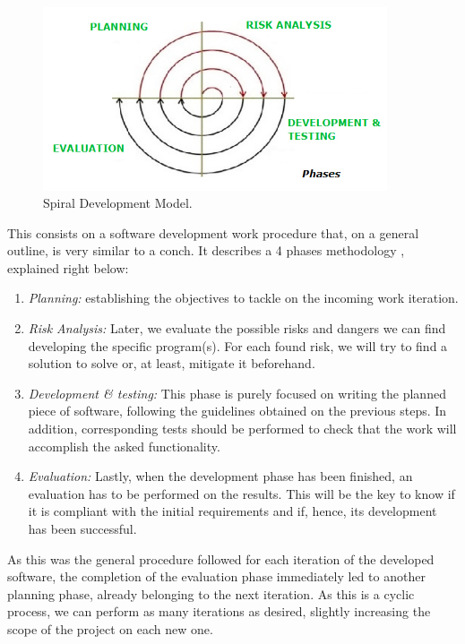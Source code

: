 \begin{figure}[h]
	\centering
	\includegraphics[width=4in]{images/spiral}
	\caption{Spiral Development Model.}
	\label{fig:2_spiral}
\end{figure}

This consists on a software development work procedure that, on a general outline, is very similar to a conch. It describes a 4 phases methodology \cite{spiral-steps}, explained right below:

\begin{enumerate}
	\item \textit{Planning:} establishing the objectives to tackle on the incoming work iteration.

	\item \textit{Risk Analysis:} Later, we evaluate the possible risks and dangers we can find developing the specific program(s). For each found risk, we will try to find a solution to solve or, at least, mitigate it beforehand.

	\item \textit{Development \& testing:} This phase is purely focused on writing the planned piece of software, following the guidelines obtained on the previous steps. In addition, corresponding tests should be performed to check that the work will accomplish the asked functionality.
	\item \textit{Evaluation:} Lastly, when the development phase has been finished, an evaluation has to be performed on the results. This will be the key to know if it is compliant with the initial requirements and if, hence, its development has been successful.
\end{enumerate}

As this was the general procedure followed for each iteration of the developed software, the completion of the evaluation phase immediately led to another planning phase, already belonging to the next iteration. As this is a cyclic process, we can perform as many iterations as desired, slightly increasing the scope of the project on each new one.\\

